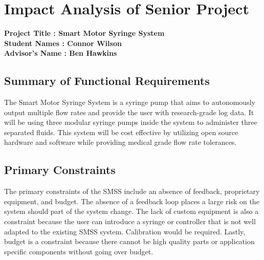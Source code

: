 \documentclass[journal]{IEEEtran}
\begin{document}
\appendices
\section{Impact Analysis of Senior Project}
    \label{Appendix:Impact}
    \textbf{
    {\-\hspace{0cm} Project Title : Smart Motor Syringe System \\
    Student Names : Connor Wilson \\
    Advisor’s Name : Ben Hawkins
    }
    }
    \subsection{Summary of Functional Requirements}
        The Smart Motor Syringe System is a syringe pump that aims to autonomously output
        multiple flow rates and provide the user with research-grade log data. It will be using three modular syringe pumps inside the system to administer three separated fluids. This system will be cost effective by utilizing open source hardware and software while providing medical grade flow rate tolerances.
    
    \subsection{Primary Constraints}
        The primary constraints of the SMSS include an absence of feedback, proprietary equipment, and budget. The absence of a feedback loop places a large risk on the system should part of the system change. The lack of custom equipment is also a constraint because the user can introduce a syringe or controller that is not well adapted to the existing SMSS system. Calibration would be required. Lastly, budget is a constraint because there cannot be high quality parts or application specific components without going over budget.
    
\end{document}
